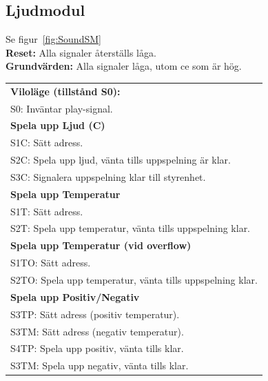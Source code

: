 \documentclass[a4paper,11pt]{article}
\begin{document}
\pagebreak

		\subsection{Ljudmodul}

			Se figur~\ref{fig:SoundSM}\\
			{\bf Reset:} Alla signaler återställs låga.\\
			{\bf Grundvärden:} Alla signaler låga, utom ce som är hög.\\
			\begin{tabular}{l}
				\\{\bf Viloläge (tillstånd S0):}\\
				S0: Inväntar play-signal.\\
				{\bf Spela upp Ljud (C)}\\
				S1C: Sätt adress.\\
				S2C: Spela upp ljud, vänta tills uppspelning är klar.\\
				S3C: Signalera uppspelning klar till styrenhet.\\
				{\bf Spela upp Temperatur}\\
				S1T: Sätt adress.\\
				S2T: Spela upp temperatur, vänta tills uppspelning klar.\\
				{\bf Spela upp Temperatur (vid overflow)}\\
				S1TO: Sätt adress.\\
				S2TO: Spela upp temperatur, vänta tills uppspelning klar.\\
				{\bf Spela upp Positiv/Negativ}\\
				S3TP: Sätt adress (positiv temperatur).\\
				S3TM: Sätt adress (negativ temperatur).\\
				S4TP: Spela upp positiv, vänta tills klar.\\
				S3TM: Spela upp negativ, vänta tills klar.\\
			\end{tabular}
\end{document}
